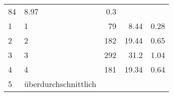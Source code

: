 \begin{longtable}{lXrrr}
       \num{84} &
       \num[round-mode=places,round-precision=2]{8,97} &
         \num[round-mode=places,round-precision=2]{0,3} \\

     1 &
     \multicolumn{1}{X}{ 1   } &


       \num{79} &
       \num[round-mode=places,round-precision=2]{8,44} &
         \num[round-mode=places,round-precision=2]{0,28} \\

     2 &
     \multicolumn{1}{X}{ 2   } &


       \num{182} &
       \num[round-mode=places,round-precision=2]{19,44} &
         \num[round-mode=places,round-precision=2]{0,65} \\

     3 &
     \multicolumn{1}{X}{ 3   } &


       \num{292} &
       \num[round-mode=places,round-precision=2]{31,2} &
         \num[round-mode=places,round-precision=2]{1,04} \\

     4 &
     \multicolumn{1}{X}{ 4   } &


       \num{181} &
       \num[round-mode=places,round-precision=2]{19,34} &
         \num[round-mode=places,round-precision=2]{0,64} \\

     5 &
     \multicolumn{1}{X}{ überdurchschnittlich   } &



\end{longtable}
